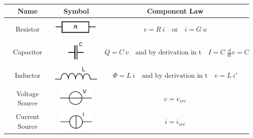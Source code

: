 	\begin{frame}
		\vfill
		\begin{table}
			\centering
			\begin{tabular}{| c | c | c |}
				\hline
				\textbf{Name} & \textbf{Symbol} & \textbf{Component Law} \\
				\hline\hline
				Resistor & \includegraphics[height=1cm]{../Tex/pictures/resistor.png} & 	$v = R \ i \quad \text{or} \quad i = G \ u$ \\
				Capacitor & \includegraphics[height=1cm]{../Tex/pictures/capacitor.png} & $Q = C \ v \quad \text{and by derivation in t} \quad I = C \ \frac{d}{dt}v = C \ v'$ \\
				Inductor & \includegraphics[height=1cm]{../Tex/pictures/inductance.png} & $\Phi = L \ i \quad \text{and by derivation in t} \quad v = L \ i'$ \\
				Voltage Source & \includegraphics[height=1cm]{../Tex/pictures/voltage_source.png} & $v = v_{src}$ \\
				Current Source & \includegraphics[height=1cm]{../Tex/pictures/current_source.png} & $i = i_{src}$ \\
				\hline
			\end{tabular}
		\end{table}
		\vfill
	\end{frame}
		
